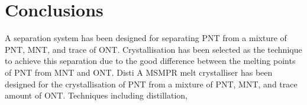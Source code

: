 \section{Conclusions}\label{separation conclusions}

A separation system has been designed for separating PNT from a mixture of PNT, MNT, and trace of ONT. Crystallisation has been selected as the technique to achieve this separation due to the good difference between the melting points of PNT from MNT and ONT. Disti A MSMPR melt crystalliser has been designed for the crystallisation of PNT from a mixture of PNT, MNT, and trace amount of ONT. Techniques including distillation, 